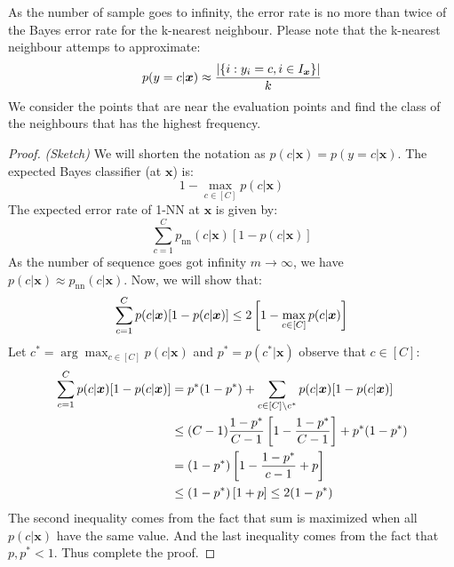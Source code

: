\begin{theorem}
    As the number of sample goes to infinity, the error rate is no more than twice of the Bayes error rate for the k-nearest neighbour. Please note that the k-nearest neighbour attemps to approximate:
    \begin{equation*}
        p(y = c | \boldsymbol x) \approx \frac{\left| \left\{ i : y_i = c, i \in I_{\boldsymbol x} \right\} \right|}{k}
    \end{equation*}
    We consider the points that are near the evaluation points and find the class of the neighbours that has the highest frequency. 
\end{theorem}
\begin{proof}{\emph{(Sketch)}}
    We will shorten the notation as $p(c | \boldsymbol x) = p(y = c | \boldsymbol x)$. The expected Bayes classifier (at $\boldsymbol x$) is:
    \begin{equation*}
        1 - \max_{c \in [C]} p(c | \boldsymbol x)
    \end{equation*}
    The expected error rate of 1-NN at $\boldsymbol x$ is given by:
    \begin{equation*}
        \sum^C_{c=1} p_\text{nn}(c | \boldsymbol x)[1 - p(c | \boldsymbol x)]
    \end{equation*}
    As the number of sequence goes got infinity $m \rightarrow \infty$, we have $p(c | \boldsymbol x)\approx p_\text{nn}(c | \boldsymbol x)$. Now, we will show that:
    \begin{equation*}
        \sum^C_{c=1}p(c | \boldsymbol x)[1 - p(c | \boldsymbol x)] \le 2\left[ 1-\max_{c\in[C]} p(c | \boldsymbol x) \right]
    \end{equation*}
    Let $c^* = \arg\max_{c\in[C]} p (c | \boldsymbol x)$ and $p^* = p(c^* | \boldsymbol x)$ observe that $c \in [C]$:
    \begin{equation*}
    \begin{aligned}
        \sum^C_{c=1}p(c | \boldsymbol x)[1 - p(c | \boldsymbol x)] &= p^*(1-p^*) + \sum_{c \in [C]\backslash c^*} p(c|\boldsymbol x)[1-p(c|\boldsymbol x)] \\
        &\le (C-1)\frac{1-p^*}{C-1}\left[ 1 - \frac{1-p^*}{C-1} \right] + p^*(1-p^*) \\
        &= (1-p^*)\left[ 1 - \frac{1-p^*}{c-1} + p \right] \\
        &\le (1-p^*)\left[ 1 + p \right] \le 2(1-p^*) \\
    \end{aligned}
    \end{equation*}
    The second inequality comes from the fact that sum is maximized when all $p(c | \boldsymbol x)$ have the same value. And the last inequality comes from the fact that $p, p^* < 1$. Thus complete the proof.
\end{proof}

